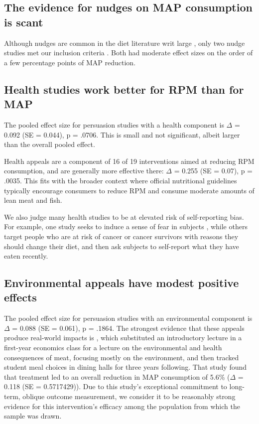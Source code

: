 \documentclass[sn-nature,pdflatex]{sn-jnl}
\begin{document}
\subsection{The evidence for nudges on MAP consumption is
scant}\label{sec2.5}

Although nudges are common in the diet literature writ large
\citep{olafsson2024, cadario2020, szaszi2018}, only two nudge studies
met our inclusion criteria \citep{andersson2021}. Both had moderate
effect sizes on the order of a few percentage points of MAP reduction.

\subsection{Health studies work better for RPM than for
MAP}\label{sec2.6}

The pooled effect size for persuasion studies with a health component is
\(\Delta\) = 0.092 (SE = 0.044), p = .0706. This is small and not
significant, albeit larger than the overall pooled effect.

Health appeals are a component of 16 of 19 interventions aimed at
reducing RPM consumption, and are generally more effective there:
\(\Delta\) = 0.255 (SE = 0.07), p = .0035. This fits with the broader
context where official nutritional guidelines typically encourage
consumers to reduce RPM and consume moderate amounts of lean meat and
fish.

We also judge many health studies to be at elevated risk of
self-reporting bias. For example, one study seeks to induce a sense of
fear in subjects \citep{berndsen2005}, while others target people who
are at risk of cancer \citep{hatami2018} or cancer survivors
\citep{james2015, lee2018} with reasons they should change their diet,
and then ask subjects to self-report what they have eaten recently.

\subsection{Environmental appeals have modest positive
effects}\label{sec2.7}

The pooled effect size for persuasion studies with an environmental
component is \(\Delta\) = 0.088 (SE = 0.061), p = .1864. The strongest
evidence that these appeals produce real-world impacts is
\citep{jalil2023}, which substituted an introductory lecture in a
first-year economics class for a lecture on the environmental and health
consequences of meat, focusing mostly on the environment, and then
tracked student meal choices in dining halls for three years following.
That study found that treatment led to an overall reduction in MAP
consumption of 5.6\% (\(\Delta\) = 0.118 (SE = 0.5717429)). Due to this
study's exceptional commitment to long-term, oblique outcome
measurement, we consider it to be reasonably strong evidence for this
intervention's efficacy among the population from which the sample was
drawn.
\end{document}
